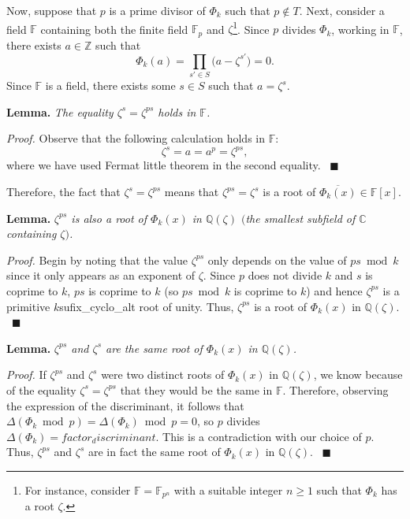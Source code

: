 \documentclass[a4paper, 12pt]{article}
\theoremstyle{definition}
\newcommand{\Z}{\mathbb{Z}}
\newcommand{\Q}{\mathbb{Q}}
\newcommand{\C}{\mathbb{C}}
\newcommand{\F}{\mathbb{F}}
\begin{document}
Now, suppose that $p$ is a prime divisor of $\Phi_{{k}}$ such that $p\notin T$. Next, consider a field $\F$ containing both the finite field $\F_p$ and $\zeta$\footnote{For instance, consider $\F=\F_{p^n}$ with a suitable integer $n\geqslant 1$ such that $\Phi_{{k}}$ has a root $\zeta$.}. Since $p$ divides $\Phi_{{k}}$, working in $\F$, there exists $a\in\Z$ such that 
\begin{equation*}
\Phi_{{k}}(a)=\prod_{s'\in S}\big(a-\zeta^{s'}\big)=0.
\end{equation*}
Since $\F$ is a field, there exists some $s\in S$ such that $a=\zeta^{s}$.

\textbf{Lemma.} \emph{The equality $\zeta^s=\zeta^{ps}$ holds in $\F$.}

\textit{Proof.} Observe that the following calculation holds in $\F$:
\begin{equation*}\label{eq:reproots}
\zeta^{s}=a=a^p=\zeta^{ps},
\end{equation*}
where we have used Fermat little theorem in the second equality. \ $\blacksquare$ 

Therefore, the fact that $\zeta^{s}=\zeta^{ps}$ means that $\zeta^{ps}=\zeta^{s}$ is a root of $\overline{\Phi_{{k}}(x)}\in\F[x]$. 

\textbf{Lemma.} \emph{$\zeta^{ps}$ is also a root of $\Phi_{{k}}(x)$ in $\Q(\zeta)$ $($the smallest subfield of $\C$ containing $\zeta)$.}

\textit{Proof.} Begin by noting that the value $\zeta^{ps}$ only depends on the value of $ps \bmod{{k}}$ since it only appears as an exponent of $\zeta$. Since $p$ does not divide ${k}$ and $s$ is coprime to ${k}$, $ps$ is coprime to ${k}$ (so $ps \bmod{{k}}$ is coprime to ${k}$) and hence $\zeta^{ps}$ is a primitive ${k}${sufix_cyclo_alt} root of unity. Thus, $\zeta^{ps}$ is a root of $\Phi_{{k}}(x)$ in $\Q(\zeta)$. \ $\blacksquare$

\textbf{Lemma.} \emph{$\zeta^{ps}$ and $\zeta^{s}$ are the same root of $\Phi_{{k}}(x)$ in $\Q(\zeta)$.}

\textit{Proof.} If $\zeta^{ps}$ and $\zeta^{s}$ were two distinct roots of $\Phi_{{k}}(x)$ in $\Q(\zeta)$, we know because of the equality $\zeta^{s}=\zeta^{ps}$ that they would be the same in $\F$. Therefore, observing the expression of the discriminant, it follows that $\Delta(\Phi_{{k}} \bmod{p})=\Delta(\Phi_{{k}}) \bmod{p}=0$, so $p$ divides $\Delta(\Phi_{{k}})={factor_discriminant}$. This is a contradiction with our choice of $p$. Thus, $\zeta^{ps}$ and $\zeta^{s}$ are in fact the same root of $\Phi_{{k}}(x)$ in $\Q(\zeta)$. \ $\blacksquare$
\end{document}
